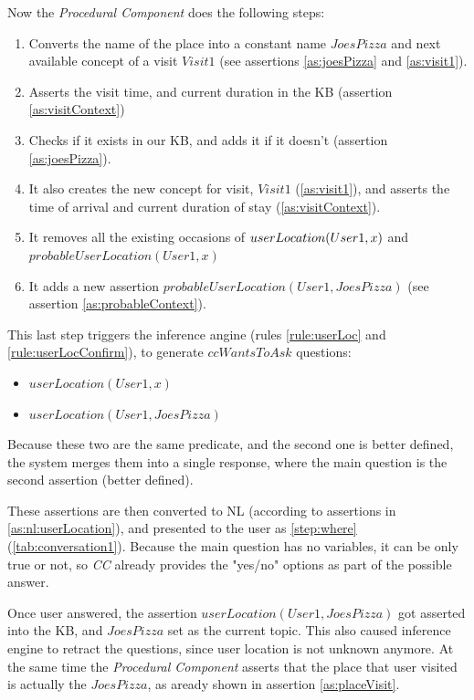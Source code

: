 Now the \emph{Procedural Component} does the following steps:
\begin{enumerate}
\item Converts the name of the place into a constant name $JoesPizza$ and next
available concept of a visit $Visit1$ (see assertions \ref{as:joesPizza} and
\ref{as:visit1}).
\item Asserts the visit time, and current duration in the KB (assertion 
\ref{as:visitContext})
\item Checks if it exists in our KB, and adds it if it doesn't (assertion 
\ref{as:joesPizza}). 
\item It also creates the new concept for visit, $Visit1$ (\ref{as:visit1}),
and asserts the time of arrival and current duration of stay 
(\ref{as:visitContext}).
\item It removes all the existing occasions of $\\userLocation(User1,x)$ and 
$probableUserLocation(User1,x)$
\item It adds a new assertion $probableUserLocation(User1,JoesPizza)$ 
(see assertion \ref{as:probableContext}).
\end{enumerate}
This last step triggers the inference angine (rules \ref{rule:userLoc} and
\ref{rule:userLocConfirm}), to generate $ccWantsToAsk$ questions:
\begin{itemize}
\item $userLocation(User1,x)$
\item $userLocation(User1,JoesPizza)$
\end{itemize}
Because these two are the same predicate, and the second one is better defined,
the system merges them into a single response, where the main question is the
second assertion (better defined). 

These assertions are then converted to NL (according to assertions in 
\ref{as:nl:userLocation}), and presented to the user as \autoref{step:where} 
(\autoref{tab:conversation1}). Because the main question has no variables, it
can be only true or not, so \emph{CC} already provides the "yes/no" options
as part of the possible answer.

Once user answered, the assertion $userLocation(User1,JoesPizza)$ got 
asserted into the KB, and $JoesPizza$ set as the current topic. This 
also caused inference engine to retract the 
questions, since user location is not unknown anymore. At the same time the
\emph{Procedural Component}  asserts that the place that user visited is
actually the $JoesPizza$, as aready shown in assertion \ref{as:placeVisit}.

